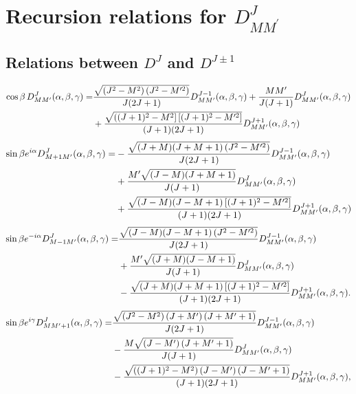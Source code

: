 \section{Recursion relations for $D_{M M^{\prime}}^{J}$}\label{sec:4.8}
\subsection{Relations between $D^{J}$ and $D^{J \pm 1}$}\label{sec:4.8.1}
\begin{align}
\cos \beta\, D_{M M^{\prime}}^{J}(\alpha, \beta, \gamma)= & \frac{\sqrt{\left(J^{2}-M^{2}\right)\left(J^{2}-M^{\prime 2}\right)}}{J(2 J+1)} D_{M M^{\prime}}^{J-1}(\alpha, \beta, \gamma)+\frac{M M^{\prime}}{J(J+1)} D_{M M^{\prime}}^{J}(\alpha, \beta, \gamma)  \notag\\
& +\frac{\sqrt{\left((J+1)^{2}-M^{2}\right]\left[(J+1)^{2}-M^{\prime 2}\right]}}{(J+1)(2 J+1)} D_{M M^{\prime}}^{J+1}(\alpha, \beta, \gamma)  \label{eq:4:8:1}
\end{align}\begin{align}
\sin \beta e^{i \alpha} D_{M+1 M^{\prime}}^{J}(\alpha, \beta, \gamma)= & -\frac{\sqrt{(J+M)(J+M+1)\left(J^{2}-M^{\prime 2}\right)}}{J(2 J+1)} D_{M M^{\prime}}^{J-1}(\alpha, \beta, \gamma)  \notag\\
& + \frac{M^{\prime} \sqrt{(J-M)(J+M+1)}}{J(J+1)} D_{M M^{\prime}}^{J}(\alpha, \beta, \gamma)  \notag\\
& +\frac{\sqrt{(J-M)(J-M+1)\left[(J+1)^{2}-M^{\prime 2}\right]}}{(J+1)(2 J+1)} D_{M M^{\prime}}^{J+1}(\alpha, \beta, \gamma)  \label{eq:4:8:2}
\end{align}\begin{align}
\sin \beta e^{-i \alpha} D_{M-1 M^{\prime}}^{J}(\alpha, \beta, \gamma)= & \frac{\sqrt{(J-M)(J-M+1)\left(J^{2}-M^{\prime 2}\right)}}{J(2 J+1)} D_{M M^{\prime}}^{J-1}(\alpha, \beta, \gamma)  \notag\\
& +\frac{M^{\prime} \sqrt{(J+M)(J-M+1)}}{J(J+1)} D_{M M^{\prime}}^{J}(\alpha, \beta, \gamma)  \notag\\
& -\frac{\sqrt{(J+M)(J+M+1)\left[(J+1)^{2}-M^{\prime 2}\right]}}{(J+1)(2 J+1)} D_{M M^{\prime}}^{J+1}(\alpha, \beta, \gamma). \label{eq:4:8:3}
\end{align}
\begin{align}
 \sin \beta e^{i \gamma} D_{M M^{\prime}+1}^{J}(\alpha, \beta, \gamma)=& \frac{\sqrt{\left(J^{2}-M^{2}\right)\left(J+M^{\prime}\right)\left(J+M^{\prime}+1\right)}}{J(2 J+1)} D_{M M^{\prime}}^{J-1}(\alpha, \beta, \gamma)  \notag\\
&- \frac{M \sqrt{\left(J-M^{\prime}\right)\left(J+M^{\prime}+1\right)}}{J(J+1)} D_{M M^{\prime}}^{J}(\alpha, \beta, \gamma)  \notag\\
&- \frac{\sqrt{\left((J+1)^{2}-M^{2}\right)\left(J-M^{\prime}\right)\left(J-M^{\prime}+1\right)}}{(J+1)(2 J+1)} D_{M M^{\prime}}^{J+1}(\alpha, \beta, \gamma),  \label{eq:4:8:4}
\end{align}
